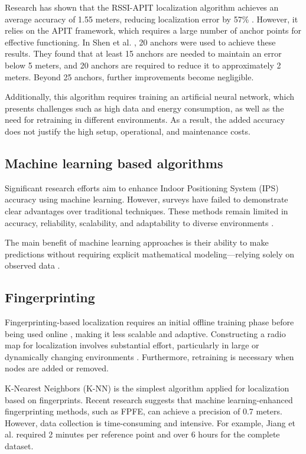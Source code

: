 Research has shown that the RSSI-APIT localization algorithm achieves an average accuracy of 1.55 meters, reducing localization error by 57\% \cite{shen_indoor_2023}. However, it relies on the APIT framework, which requires a large number of anchor points for effective functioning. In Shen et al. \cite{shen_indoor_2023}, 20 anchors were used to achieve these results. They found that at least 15 anchors are needed to maintain an error below 5 meters, and 20 anchors are required to reduce it to approximately 2 meters. Beyond 25 anchors, further improvements become negligible.   

Additionally, this algorithm requires training an artificial neural network, which presents challenges such as high data and energy consumption, as well as the need for retraining in different environments. As a result, the added accuracy does not justify the high setup, operational, and maintenance costs. 

\subsection{Machine learning based algorithms}

Significant research efforts aim to enhance Indoor Positioning System (IPS) accuracy using machine learning. However, surveys have failed to demonstrate clear advantages over traditional techniques. These methods remain limited in accuracy, reliability, scalability, and adaptability to diverse environments \cite{nessa_survey_2020}.   

The main benefit of machine learning approaches is their ability to make predictions without requiring explicit mathematical modeling—relying solely on observed data \cite{nessa_survey_2020}.

\subsection{Fingerprinting}

Fingerprinting-based localization requires an initial offline training phase before being used online \cite{nessa_survey_2020}, making it less scalable and adaptive. Constructing a radio map for localization involves substantial effort, particularly in large or dynamically changing environments \cite{nessa_survey_2020}. Furthermore, retraining is necessary when nodes are added or removed.   

K-Nearest Neighbors (K-NN) is the simplest algorithm applied for localization based on fingerprints. Recent research suggests that machine learning-enhanced fingerprinting methods, such as FPFE, can achieve a precision of 0.7 meters. However, data collection is time-consuming and intensive. For example, Jiang et al. \cite{jiang_fingerprint_2021} required 2 minutes per reference point and over 6 hours for the complete dataset.   

